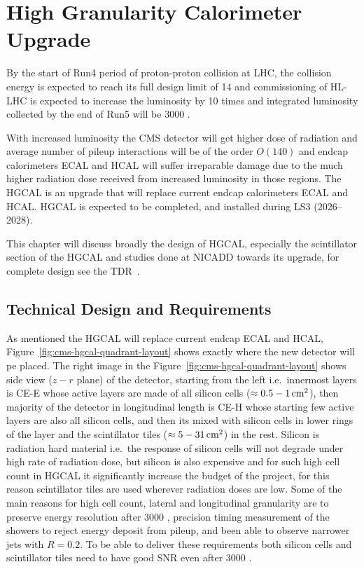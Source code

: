 \chapter{
  High Granularity Calorimeter Upgrade
 }\label{ch_hgcal}

By the start of Run4 period of proton-proton collision
at \gls{LHC}, the collision energy is expected to
reach its full design limit of 14 \TeV{} and
commissioning of \gls{HL-LHC} is expected to
increase the luminosity by 10 times and
integrated luminosity collected by the end of Run5 will be 3000 \fbinv{}.

With increased luminosity the \gls{CMS} detector will get
higher dose of radiation and average number of pileup interactions
will be of the order \( O(140) \) and endcap calorimeters \gls{ECAL} and \gls{HCAL} will suffer
irreparable damage due to the much higher radiation dose received
from increased luminosity in those regions.
The \gls{HGCAL} is an upgrade that will replace current endcap calorimeters
\gls{ECAL} and \gls{HCAL}.
\gls{HGCAL} is expected to be completed, and installed
during \gls{LS3} (2026--2028).

This chapter will discuss broadly the design
of \gls{HGCAL}, especially the scintillator section of the \gls{HGCAL}
and studies done at \gls{NICADD} towards its upgrade,
for complete design see the \gls{TDR}~\cite{cms-hgcal-tdr}.

\section{
  Technical Design and Requirements
 }\label{ch_hgcal:technical-design}

As mentioned the \gls{HGCAL} will replace current endcap \gls{ECAL} and
\gls{HCAL}, Figure~\ref{fig:cms-hgcal-quadrant-layout}
shows exactly where the new detector will pe placed. The right image in the
Figure~\ref{fig:cms-hgcal-quadrant-layout} shows side view (\( z-r \) plane)
of the detector, starting from the left i.e.~innermost layers is
\gls{CE-E} whose active layers are made of all silicon cells
(\( \approx 0.5-1 \,\text{cm}{}^2\)), then
majority of the detector in longitudinal length is \gls{CE-H}
whose starting few active layers are also all silicon cells, and
then its mixed with silicon cells in lower rings of the
layer and the scintillator tiles (\( \approx 5-31 \,\text{cm}{}^2\)) in the rest.
Silicon is radiation hard material i.e.~the response of silicon cells
will not degrade under high rate of radiation dose, but
silicon is also expensive and for such high cell count in \gls{HGCAL}
it significantly increase the budget of the project, for this
reason scintillator tiles are used wherever radiation doses are low.
Some of the main reasons for high cell count, lateral and longitudinal granularity
are to preserve energy resolution after 3000 \fbinv{}, precision
timing measurement of the showers to reject energy deposit from pileup, and
been able to observe narrower jets with \( R = 0.2 \).
To be able to deliver these requirements both silicon cells and scintillator tiles
need to have good \gls{SNR} even after 3000 \fbinv{}.

